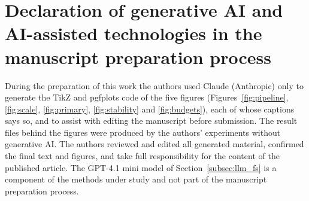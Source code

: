 \documentclass[final,5p,twocolumn]{elsarticle}
\begin{document}
\clearpage


\section*{Declaration of generative AI and AI-assisted technologies in the manuscript preparation process}
During the preparation of this work the authors used Claude (Anthropic) only to generate the TikZ and pgfplots code of the five figures (Figures~\ref{fig:pipeline}, \ref{fig:scale}, \ref{fig:primary}, \ref{fig:stability} and \ref{fig:budgets}), each of whose captions says so, and to assist with editing the manuscript before submission. The result files behind the figures were produced by the authors' experiments without generative AI. The authors reviewed and edited all generated material, confirmed the final text and figures, and take full responsibility for the content of the published article. The GPT-4.1 mini model of Section~\ref{subsec:llm_fs} is a component of the methods under study and not part of the manuscript preparation process.
\end{document}

